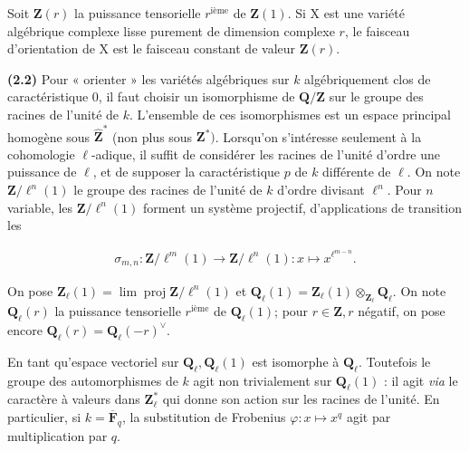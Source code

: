 \documentclass[10pt,leqno]{article}
\begin{document}
\noindent Soit \(\mathbf{Z}(r)\) la puissance tensorielle \(r^{\mathrm{ième}}\) de \(\mathbf{Z}(1)\). Si \(\mathrm{X}\) est une variété algébrique complexe lisse purement de dimension complexe \(r\), le faisceau d’orientation de \(\mathrm{X}\) est le faisceau constant de valeur \(\mathbf{Z}(r)\).\par

\noindent \textbf{(2.2)} Pour « orienter » les variétés algébriques sur \(k\) algébriquement clos de caractéristique 0, il faut choisir un isomorphisme de \(\mathbf{Q}/\mathbf{Z}\) sur le groupe des racines de l’unité de \(k\). L’ensemble de ces isomorphismes est un espace principal homogène sous \(\widehat{\mathbf{Z}}^{*}\) (non plus sous \(\mathbf{Z}^{*})\). Lorsqu’on s’intéresse seulement à la cohomologie \(\ell \)-adique, il suffit de considérer les racines de l’unité d’ordre une puissance de \(\ell \), et de supposer la caractéristique \(p\) de \(k\) différente de \(\ell \). On note \(\mathbf{Z}/\ell ^{n}(1)\) le groupe des racines de l’unité de \(k\) d’ordre divisant \(\ell ^{n}\). Pour \(n\) variable, les \(\mathbf{Z}/\ell ^{n}(1)\) forment un système projectif, d’applications de transition les\par

\begin{equation*}\begin{gathered}\sigma _{m,n} : \mathbf{Z}/\ell ^{m}(1) \longrightarrow  \mathbf{Z}/\ell ^{n}(1) : x\longmapsto x^{\ell ^{m- n}}.\end{gathered}\end{equation*}

\noindent On pose \(\mathbf{Z}_{\ell }(1)=\operatorname{lim} \operatorname{proj} \mathbf{Z}/\ell ^{n}(1)\) et \(\mathbf{Q}_{\ell }(1)=\mathbf{Z}_{\ell }(1)\otimes _{\mathbf{Z}_{\ell }}\mathbf{Q}_{\ell }\). On note \(\mathbf{Q}_{\ell }(r)\) la puissance tensorielle \(r^{\mathrm{ième}}\) de \(\mathbf{Q}_{\ell }(1)\); pour \(r\in \mathbf{Z}, r\) négatif, on pose encore \(\mathbf{Q}_{\ell }(r)=\mathbf{Q}_{\ell }(- r)^{\vee }\).\par

\clearpage

\label{physical-10}

\noindent En tant qu’espace vectoriel sur \(\mathbf{Q}_{\ell }, \mathbf{Q}_{\ell }(1)\) est isomorphe à \(\mathbf{Q}_{\ell }\). Toutefois le groupe des automorphismes de \(k\) agit non trivialement sur \(\mathbf{Q}_{\ell }(1)\) : il agit \emph{via} le caractère à valeurs dans \(\mathbf{Z}_{\ell }^{*}\) qui donne son action sur les racines de l’unité. En particulier, si \(k=\overline{\mathbf{F}}_{q}\), la substitution de Frobenius \(\varphi  : x\longmapsto x^{q}\) agit par multiplication par \(q\).\par
\end{document}
